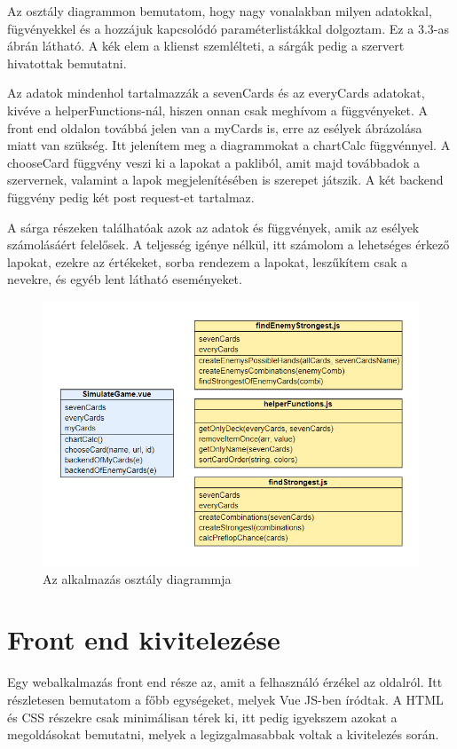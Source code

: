 Az osztály diagrammon bemutatom, hogy nagy vonalakban milyen adatokkal, fügvényekkel és a hozzájuk kapcsolódó paraméterlistákkal dolgoztam. Ez a 3.3-as ábrán látható. A kék elem a klienst szemlélteti, a sárgák pedig a szervert hivatottak bemutatni.

Az adatok mindenhol tartalmazzák a sevenCards és az everyCards adatokat, kivéve a helperFunctions-nál, hiszen onnan csak meghívom a függvényeket. A front end oldalon továbbá jelen van a myCards is, erre az esélyek ábrázolása miatt van szükség. Itt jelenítem meg a diagrammokat a chartCalc függvénnyel. A chooseCard függvény veszi ki a lapokat a pakliból, amit majd továbbadok a szervernek, valamint a lapok megjelenítésében is szerepet játszik. A két backend függvény pedig két post request-et tartalmaz.

A sárga részeken találhatóak azok az adatok és függvények, amik az esélyek számolásáért felelősek. A teljesség igénye nélkül, itt számolom a lehetséges érkező lapokat, ezekre az értékeket, sorba rendezem a lapokat, leszűkítem csak a nevekre, és egyéb lent látható eseményeket.

\begin{figure}[h]
\centering
\includegraphics[scale=0.9]{images/class-model.png}
\caption{Az alkalmazás osztály diagrammja}
\label{fig:class-model}
\end{figure}

\section{Front end kivitelezése}
Egy webalkalmazás front end része az, amit a felhasználó érzékel az oldalról. Itt részletesen bemutatom a főbb egységeket, melyek Vue JS-ben íródtak. A HTML és CSS részekre csak minimálisan térek ki, itt pedig igyekszem azokat a megoldásokat bemutatni, melyek a legizgalmasabbak voltak a kivitelezés során. 

